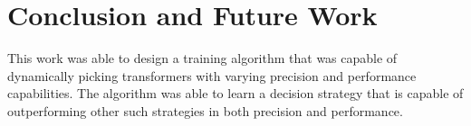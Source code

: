 
\chapter{Conclusion and Future Work}

This work was able to design a training algorithm that was capable of dynamically picking transformers with varying precision and performance capabilities. The algorithm was able to learn a decision strategy that is capable of outperforming other such strategies in both precision and performance. 